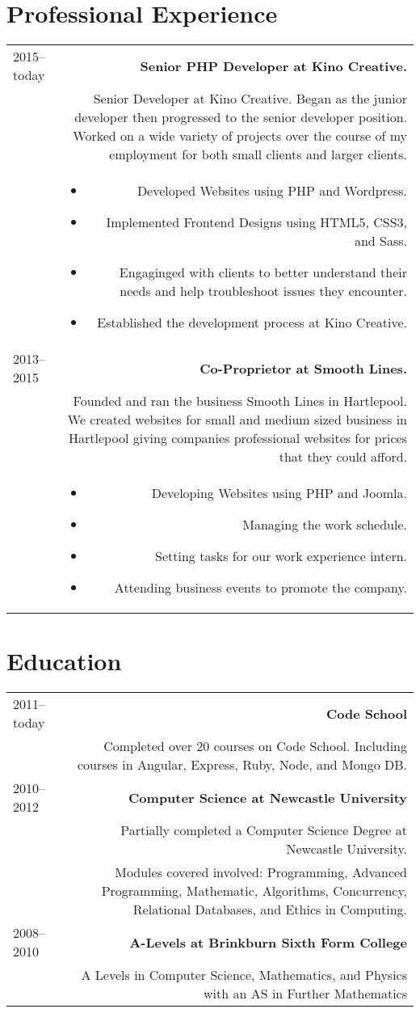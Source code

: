 \documentclass[10pt]{article}
\begin{document}
\section*{Professional Experience}
\begin{tabular}{L!{\VRule}R}
2015--today&{\bf Senior PHP Developer at Kino Creative.}\\
&Senior Developer at Kino Creative. Began as the junior developer then progressed to the senior developer position. Worked on a wide variety of projects over the course of my employment for both small clients and larger clients.\\
&\begin{itemize}
\item Developed Websites using PHP and Wordpress.
\item Implemented Frontend Designs using HTML5, CSS3, and Sass.
\item Engaginged with clients to better understand their needs and help troubleshoot issues they encounter.
\item Established the development process at Kino Creative.
\end{itemize}\\
2013--2015&{\bf Co-Proprietor at Smooth Lines.}\\
&Founded and ran the business Smooth Lines in Hartlepool. We created websites for small and medium sized business in Hartlepool giving companies professional websites for prices that they could afford.\\
&\begin{itemize}
\item Developing Websites using PHP and Joomla.
\item Managing the work schedule.
\item Setting tasks for our work experience intern.
\item Attending business events to promote the company.
\end{itemize}\\
\end{tabular}

\section*{Education}
\begin{tabular}{L!{\VRule}R}
2011--today&{\bf Code School}\\
&Completed over 20 courses on Code School. Including courses in Angular, Express, Ruby, Node, and Mongo DB.\\
2010--2012&{\bf Computer Science at Newcastle University}\\
&Partially completed a Computer Science Degree at Newcastle University.\\
&Modules covered involved: Programming, Advanced Programming, Mathematic, Algorithms, Concurrency, Relational Databases, and Ethics in Computing.\\
2008--2010&{\bf A-Levels at Brinkburn Sixth Form College}\\
&A Levels in Computer Science, Mathematics, and Physics with an AS in Further Mathematics
\end{tabular}
\end{document}
